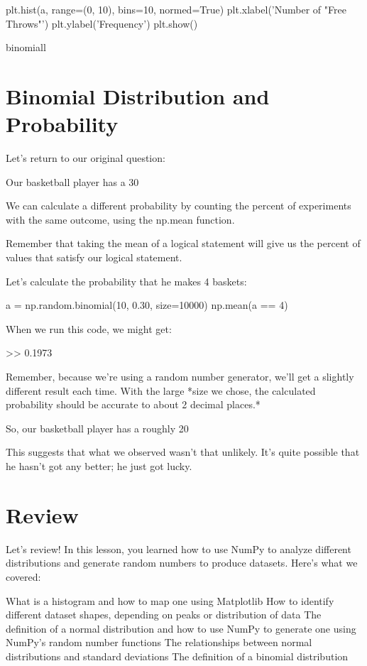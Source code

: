 \documentclass{journal}
\begin{document}
plt.hist(a, range=(0, 10), bins=10, normed=True)
plt.xlabel('Number of "Free Throws"')
plt.ylabel('Frequency')
plt.show()

binomiall


\section{Binomial Distribution and Probability}
Let's return to our original question:

Our basketball player has a 30%

We can calculate a different probability by counting the percent of experiments with the same outcome, using the np.mean function.

Remember that taking the mean of a logical statement will give us the percent of values that satisfy our logical statement.

Let's calculate the probability that he makes 4 baskets:

a = np.random.binomial(10, 0.30, size=10000)
np.mean(a == 4)

When we run this code, we might get:

>> 0.1973

Remember, because we're using a random number generator, we'll get a slightly different result each time. With the large *size we chose, the calculated probability should be accurate to about 2 decimal places.*

So, our basketball player has a roughly 20%

This suggests that what we observed wasn't that unlikely. It's quite possible that he hasn't got any better; he just got lucky.

\section{Review}
Let's review! In this lesson, you learned how to use NumPy to analyze different distributions and generate random numbers to produce datasets. Here's what we covered:

    What is a histogram and how to map one using Matplotlib
    How to identify different dataset shapes, depending on peaks or distribution of data
    The definition of a normal distribution and how to use NumPy to generate one using NumPy's random number functions
    The relationships between normal distributions and standard deviations
    The definition of a binomial distribution
\end{document}
